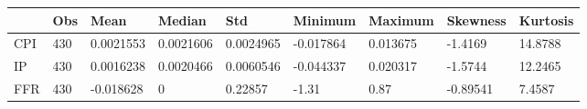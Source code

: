 \begin{tabular}{lllllllll}
\toprule 
& Obs & Mean & Median & Std & Minimum & Maximum & Skewness & Kurtosis \\ 
\midrule 
CPI & 430 & 0.0021553 & 0.0021606 & 0.0024965 & -0.017864 & 0.013675 & -1.4169 & 14.8788 \\ 
IP & 430 & 0.0016238 & 0.0020466 & 0.0060546 & -0.044337 & 0.020317 & -1.5744 & 12.2465 \\ 
FFR & 430 & -0.018628 & 0 & 0.22857 & -1.31 & 0.87 & -0.89541 & 7.4587 \\ 
\bottomrule 
\end{tabular}